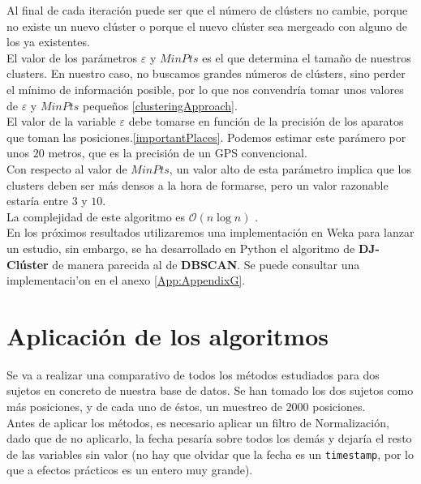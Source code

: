 \documentclass[a4paper, 12pt]{article}
\begin{document}
Al final de cada iteraci\'on puede ser que el n\'umero de cl\'usters no cambie, porque no existe un nuevo cl\'uster o porque el nuevo cl\'uster sea mergeado con alguno de los ya existentes.\\


El valor de los par\'ametros $\varepsilon$ y $MinPts$ es el que determina el tama\~no de nuestros clusters. En nuestro caso, no buscamos grandes n\'umeros de cl\'usters, sino perder el m\'inimo de informaci\'on posible, por lo que nos convendr\'ia tomar unos valores de $\varepsilon$ y $MinPts$ peque\~nos \ref{clusteringApproach}.\\

El valor de la variable $\varepsilon$ debe tomarse en funci\'on de la precisi\'on de los aparatos que toman las posiciones.\ref{importantPlaces}. Podemos estimar este par\'amero por unos $20$ metros, que es la precisi\'on de un GPS convencional. \\

Con respecto al valor de $MinPts$, un valor alto de esta par\'ametro implica que los clusters deben ser m\'as densos a la hora de formarse, pero un valor razonable estar\'ia entre $3$ y $10$.\cite{clusteringApproach}\\

La complejidad de este algoritmo es $\mathcal{O}(n\log{}n)$ \cite{importantPlaces}.\\

En los pr\'oximos resultados utilizaremos una implementaci\'on en Weka para lanzar un estudio, sin embargo, se ha desarrollado en Python el algoritmo de \textbf{DJ-Cl\'uster} de manera parecida al de \textbf{DBSCAN}. Se puede consultar una implementaci\i'on en el anexo \ref{App:AppendixG}.


\pagebreak
\section{Aplicaci\'on de los algoritmos}


Se va a realizar una comparativo de todos los m\'etodos estudiados para dos sujetos en concreto de nuestra base de datos. Se han tomado los dos sujetos como m\'as posiciones, y de cada uno de \'estos, un muestreo de $2000$ posiciones. \\

Antes de aplicar los m\'etodos, es necesario aplicar un filtro de Normalizaci\'on, dado que de no aplicarlo, la fecha pesar\'ia sobre todos los dem\'as y dejar\'ia el resto de las variables sin valor (no hay que olvidar que la fecha es un \texttt{timestamp}, por lo que a efectos pr\'acticos es un entero muy grande). \\
\end{document}
